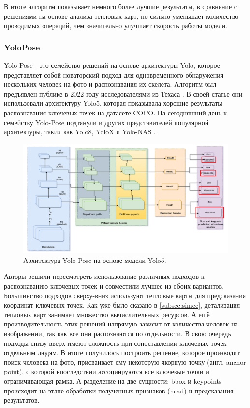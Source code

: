 В итоге алгоритм показывает немного более лучшие результаты, в сравнение с решениями на основе анализа тепловых карт, но сильно уменьшает количество проводимых операций, чем значительно улучшает скорость работы модели.

\subsubsection*{YoloPose}

Yolo-Pose - это семейство решений на основе архитектуры Yolo, которое представляет собой новаторский подход для одновременного обнаружения нескольких человек на фото и распознавания их скелета. Алгоритм был предъявлен публике в 2022 году исследователями из Техаса \cite{yolo_pose}. В своей статье они использовали архитектуру Yolo5, которая показывала хорошие результаты распознавания ключевых точек на датасете COCO. На сегодняшний день к семейству Yolo-Pose подтянули и других представителей популярной архитектуры, таких как Yolo8, YoloX и Yolo-NAS \cite{yolo8, yolox}.

\begin{figure}[h]
	\centering
	\includegraphics[width=\textwidth]{./images/yolo_pose}
	\caption{Архитектура Yolo-Pose на основе модели Yolo5. \cite{yolo_pose}}
	\label{fig:yolo_pose}
\end{figure}

Авторы решили пересмотреть использование различных подходов к распознаванию ключевых точек и совместили лучшее из обоих вариантов. Большинство подходов сверху-вниз используют тепловые карты для предсказания координат ключевых точек. Как уже было сказано в \autoref{subsec:simcc}, детализация тепловых карт занимает множество вычислительных ресурсов. А ещё производительность этих решений напрямую зависит от количества человек на изображении, так как все они распознаются по отдельности. В свою очередь подходы снизу-вверх имеют сложность при сопоставлении ключевых точек отдельным людям. В итоге получилось построить решение, которое производит поиск человека на фото, присваивает ему некоторую якорную точку (англ. anchor point), с которой впоследствии ассоциируются все ключевые точки и ограничивающая рамка. А разделение на две сущности: bbox и keypoints происходит на этапе обработки полученных признаков (head) и предсказания результатов.

